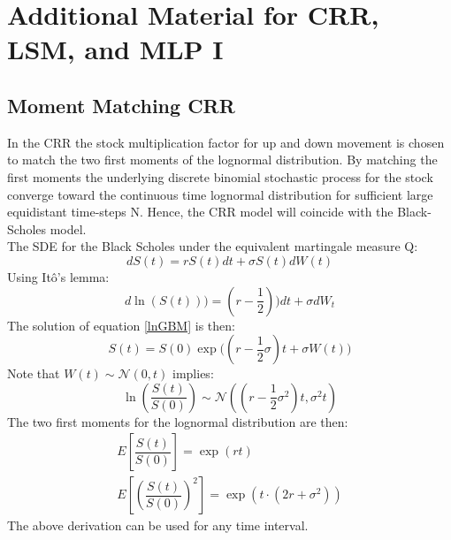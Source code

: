 
\chapter{Additional Material for CRR, LSM, and MLP I} %

\label{AppendixC} %

\section{Moment Matching CRR}\label{CRRMM}
In the CRR the stock multiplication factor for up and down movement is chosen to match the two first moments of the lognormal distribution. By matching the first moments the underlying discrete binomial stochastic process for the stock converge toward the continuous time lognormal distribution for sufficient large equidistant time-steps N. Hence, the CRR model will coincide with the Black-Scholes model.\\

The SDE for the Black Scholes under the equivalent martingale measure Q:
$$dS(t)=rS(t)dt + \sigma S(t) dW(t)$$
Using Itô's lemma:
\begin{equation}\label{lnGBM}
d\ln(S(t)))=(r-\frac{1}{2}))dt + \sigma dW_t
\end{equation}
The solution of equation \ref{lnGBM} is then:
$$S(t)=S(0)\exp\bigg((r-\dfrac{1}{2}\sigma)t+ \sigma W(t) \bigg)$$
Note that $W(t)\sim \mathcal{N}(0,t)$ implies:
$$\ln(\dfrac{S(t)}{S(0)}) \sim \mathcal{N}((r-\dfrac{1}{2}\sigma^2)t, \sigma^2 t)$$
The two first moments for the lognormal distribution are then:
\begin{equation}\label{lnMoments}
\begin{split}
E[\dfrac{S(t)}{S(0)}]=\exp(rt)\\
E[(\dfrac{S(t)}{S(0)})^2]=\exp(t\cdot (2r + \sigma^2))
\end{split}
\end{equation}
The above derivation can be used for any time interval.\\

